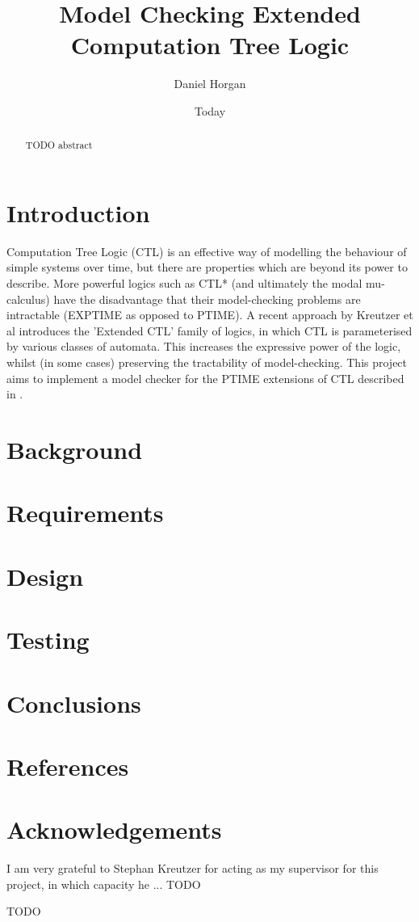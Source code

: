 \documentclass[11pt]{article}
\begin{document}
\title{Model Checking Extended Computation Tree Logic}
\author{Daniel Horgan}
\date{Today}
\maketitle

\begin{comment}
[scratch]
Blablabla said Nobody ~\cite{Nobody06}.
\end{comment}

\begin{abstract}

TODO abstract

\end{abstract}

\section{Introduction}

Computation Tree Logic (CTL) is an effective way of modelling the behaviour of simple systems over time, but there are properties which are beyond its power to describe. More powerful logics such as CTL* (and ultimately the modal mu-calculus) have the disadvantage that their model-checking problems are intractable (EXPTIME as opposed to PTIME). A recent approach by Kreutzer et al \cite{Kreutzer10} introduces the 'Extended CTL' family of logics, in which CTL is parameterised by various classes of automata. This increases the expressive power of the logic, whilst (in some cases) preserving the tractability of model-checking. This project aims to implement a model checker for the PTIME extensions of CTL described in \cite{Kreutzer10}.

\section{Background}

\section{Requirements}

\section{Design}

\section{Testing}

\section{Conclusions}

\section{References}

\section{Acknowledgements}

I am very grateful to Stephan Kreutzer for acting as my supervisor for this project, in which capacity he ... TODO

TODO



{}

\end{document}
